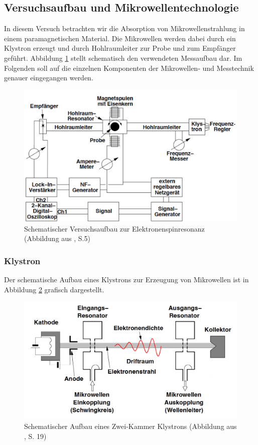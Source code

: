 \documentclass{scrartcl}
\begin{document}
\subsection{Versuchsaufbau und Mikrowellentechnologie}
In diesem Versuch betrachten wir die Absorption von Mikrowellenstrahlung in einem paramagnetischen Material. Die Mikrowellen werden dabei durch ein Klystron erzeugt und durch Hohlraumleiter zur Probe und zum Empfänger geführt. Abbildung \ref{fig:Aufbau} stellt schematisch den verwendeten Messaufbau dar. Im Folgenden soll auf die einzelnen Komponenten der Mikrowellen- und Messtechnik genauer eingegangen werden.

\begin{figure}
    \centering
    \includegraphics[scale=0.4]{Versuchsaufbau.png}
    \caption{Schematischer Versuchsaufbau zur Elektronenspinresonanz (Abbildung aus \cite{Anleitung}, S.5)}
    \label{fig:Aufbau}
\end{figure}

\subsubsection{Klystron}
Der schematische Aufbau eines Klystrons zur Erzeugung von Mikrowellen ist in Abbildung \ref{fig:Klystron} grafisch dargestellt.

\begin{figure}[h!]
    \centering
    \includegraphics[scale=0.4]{Klystron.png}
    \caption{Schematischer Aufbau eines Zwei-Kammer Klystrons (Abbildung aus \cite{Grundlagen}, S. 19)}
    \label{fig:Klystron}
\end{figure}
\end{document}
